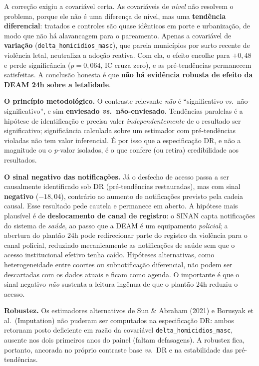 \documentclass[twocolumn, 10pt]{article}
\begin{document}
A correção exigiu a covariável certa. As covariáveis de \textit{nível} não
resolvem o problema, porque ele não é uma diferença de nível, mas uma
\textbf{tendência diferencial}: tratados e controles são quase idênticos em
porte e urbanização, de modo que não há alavancagem para o pareamento. Apenas a
covariável de \textbf{variação} (\texttt{delta\_homicidios\_masc}), que pareia
municípios por surto recente de violência letal, neutraliza a adoção reativa. Com
ela, o efeito encolhe para $+0{,}48$ e perde significância ($p=0{,}064$, IC cruza
zero), e as pré-tendências permanecem satisfeitas. A conclusão honesta é que
\textbf{não há evidência robusta de efeito da DEAM 24h sobre a letalidade}.

\textbf{O princípio metodológico.} O contraste relevante \textit{não} é
``significativo \textit{vs.}\ não-significativo'', e sim \textbf{enviesado
\textit{vs.}\ não-enviesado}. Tendências paralelas é a hipótese de identificação
e precisa valer \textit{independentemente} de o resultado ser significativo;
significância calculada sobre um estimador com pré-tendências violadas não tem
valor inferencial. É por isso que a especificação DR, e não a magnitude ou o
\textit{p}-valor isolados, é o que confere (ou retira) credibilidade aos
resultados.

\textbf{O sinal negativo das notificações.} Já o desfecho de acesso passa a ser
causalmente identificado sob DR (pré-tendências restauradas), mas com sinal
\textbf{negativo} ($-18{,}04$), contrário ao aumento de notificações previsto
pela cadeia causal. Esse resultado pede cautela e permanece em aberto. A hipótese
mais plausível é de \textbf{deslocamento de canal de registro}: o SINAN capta
notificações do sistema de \textit{saúde}, ao passo que a DEAM é um equipamento
\textit{policial}; a abertura do plantão 24h pode redirecionar parte do registro
da violência para o canal policial, reduzindo mecanicamente as notificações de
saúde sem que o acesso institucional efetivo tenha caído. Hipóteses alternativas,
como heterogeneidade entre coortes ou subnotificação diferencial, não podem ser
descartadas com os dados atuais e ficam como agenda. O importante é que o sinal
negativo \textit{não} sustenta a leitura ingênua de que o plantão 24h reduziu o
acesso.

\textbf{Robustez.} Os estimadores alternativos de Sun \& Abraham (2021) e
Borusyak et al.\ (Imputation) não puderam ser computados na especificação DR:
ambos retornam posto deficiente em razão da covariável \texttt{delta\_homicidios\_masc},
ausente nos dois primeiros anos do painel (faltam defasagens). A robustez fica,
portanto, ancorada no próprio contraste base \textit{vs.}\ DR e na estabilidade
das pré-tendências.
\end{document}
